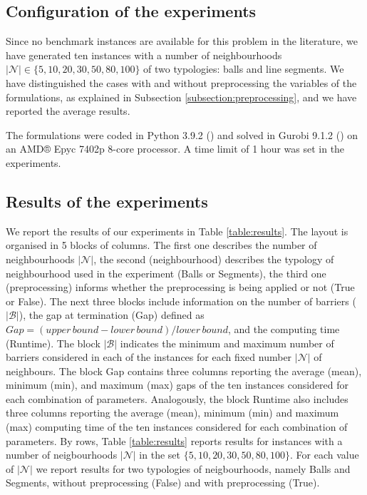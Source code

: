 \documentclass[a4paper,  review, authoryear, 1p.]{elsarticle}
\begin{document}
	\subsection{Configuration of the experiments}
	Since no benchmark instances are available for this problem in the literature, we have generated ten instances with a number of neighbourhoods $|\mathcal N|\in\{5, 10, 20, 30, 50, 80, 100\}$ of two typologies: balls and line segments. We have distinguished the cases with and without preprocessing the variables of the formulations, as explained in Subsection \ref{subsection:preprocessing}, and we have reported the average results. 
	
	The formulations were coded in Python 3.9.2 (\citet{g_van_rossum_guido_python_1995}) and solved in Gurobi 9.1.2 (\citet{gurobi_optimization_llc_gurobi_2022}) on an AMD® Epyc 7402p 8-core processor. A time limit of 1 hour was set in the experiments.
	
	\subsection{Results of the experiments}
	We report the results of our experiments in Table \ref{table:results}. The layout is organised in 5 blocks of columns. The first one describes the number of neighbourhoods $|\mathcal{N}|$, the second (neighbourhood) describes the typology of neighbourhood used in the experiment (Balls or Segments), the third one (preprocessing)  informs whether the preprocessing is being applied or not (True or False). The next three blocks include information  on the number of barriers ($|\mathcal{B}|$), the  gap at termination (Gap) defined as $Gap=(upper\, bound - lower\, bound)/lower\, bound$, and the computing time (Runtime). The block $|\mathcal{B}|$ indicates the minimum and maximum number of barriers considered in each of the instances for each fixed number $|\mathcal{N}|$ of neighbours. The block Gap contains three columns reporting the average (mean), minimum (min), and maximum (max) gaps of the ten instances considered for each combination of parameters. Analogously, the block Runtime also includes three columns reporting the average (mean), minimum (min) and maximum (max) computing time of the ten instances considered for each combination of parameters.
	By rows, Table \ref{table:results} reports results for instances with a number of neigbourhoods $|\mathcal{N}|$ in the set $\{5,10,20,30,50,80,100\}$. For each value of $|\mathcal{N}|$  we report results for two typologies of neigbourhoods, namely Balls and Segments, without preprocessing (False) and with preprocessing (True).
	
\end{document}
